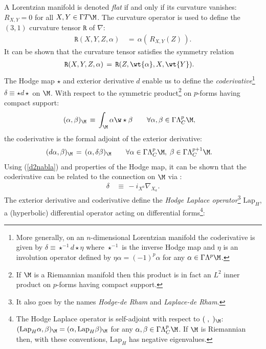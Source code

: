 \documentclass[sections]{tjwNOTES}
\newcommand{\LapH}{\text{Lap}_{H}}
\begin{document}
A Lorentzian manifold is denoted {\it flat} if and only if its curvature vanishes: $R_{X,Y}=0$ for all $X,Y\in\Gamma T\M$. The curvature operator is used to define the $(3,1)$ curvature tensor $\texttt{R}$ of $\nabla$:
\begin{align}\label{CurvT}
	\texttt{R}(X,Y,Z,\alpha) &\,=\, \alpha( \,R_{X,Y}(Z)\, ).
\end{align}
It can be shown that the curvature tensor satisfies the symmetry relation \cite{Spivak}
\begin{align}\label{CurvT_SYM}
	\texttt{R}(X,Y,Z,\alpha) &\,=\, \texttt{R}(Z,\wt{\alpha},X,\wt{Y}).
\end{align}
The Hodge map $\star$ and exterior derivative $d$ enable us to define the {\it coderivative}\footnote{More generally, on an $n$-dimensional Lorentzian manifold the coderivative is given by $\delta \equiv \star^{-1}d\star \eta$ where $\star^{-1}$ is the inverse Hodge map and $\eta$ is an involution operator defined by $\eta\alpha=(-1)^{p}\alpha$ for any $\alpha\in\Gamma\Lambda^{p}\M$.} $\delta \equiv \star d \star$ on $\M$. With respect to the symmetric product\footnote{If $\M$ is a Riemannian manifold then this product is in fact an $L^{2}$ inner product on $p$-forms having compact support.} on $p$-forms having compact support:
\begin{align*}
	(\alpha,\beta)_{\M} &\,\equiv\, \int_{\M} \alpha \w \star \beta \qquad\forall\alpha,\beta\in\Gamma\Lambda^{p}_{C}\M,
\end{align*}
the coderivative is the formal adjoint of the exterior derivative: 
\begin{align*}
	(d\alpha, \beta)_{\M} &\,=\, (\alpha,\delta\beta)_{\M} \qquad\forall \alpha\in\Gamma\Lambda^{p}_{C}\M,\; \beta\in\Gamma\Lambda^{p+1}_{C}\M.
\end{align*}
Using (\ref{d2nabla}) and properties of the Hodge map, it can be shown that the coderivative can be related to the connection on $\M$ via \cite{BennTucker}:
\begin{align}\label{del2nabla}
	\delta &\,\equiv\, -i_{X^{a}}\nabla_{X_{a}}.
\end{align}
The exterior derivative and coderivative define the {\it Hodge Laplace operator}\footnote{It also goes by the names {\it Hodge-de Rham} and {\it Laplace-de Rham}. } $\LapH$, a (hyperbolic) differential operator acting on differential forms\footnote{The Hodge Laplace operator is self-adjoint with respect to $(\;,\;)_{\M}$: $(\LapH\alpha,\beta)_{\M}=(\alpha,\LapH\beta)_{\M}$ for any $\alpha,\beta\in\Gamma\Lambda^{p}_{C}\M$. If $\M$ is Riemannian then, with these conventions, $\LapH$ has negative eigenvalues.}:
\end{document}
